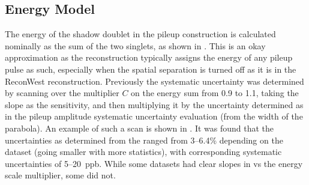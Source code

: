 




\clearpage
\subsection{Energy Model}

The energy of the shadow doublet in the pileup construction is calculated nominally as the sum of the two singlets, as shown in . This is an okay approximation as the reconstruction typically assigns the energy of any pileup pulse as such, especially when the spatial separation is turned off as it is in the ReconWest reconstruction. Previously the systematic uncertainty was determined by scanning over the multiplier $C$ on the energy sum from 0.9 to 1.1, taking the slope as the sensitivity, and then multiplying it by the uncertainty determined as in the pileup amplitude systematic uncertainty evaluation (from the width of the \chisq parabola). An example of such a scan is shown in . It was found that the uncertainties as determined from the \chisq ranged from 3--6.4\% depending on the dataset (going smaller with more statistics), with corresponding systematic uncertainties of 5--20~ppb. While some datasets had clear slopes in \R vs the energy scale multiplier, some did not.




